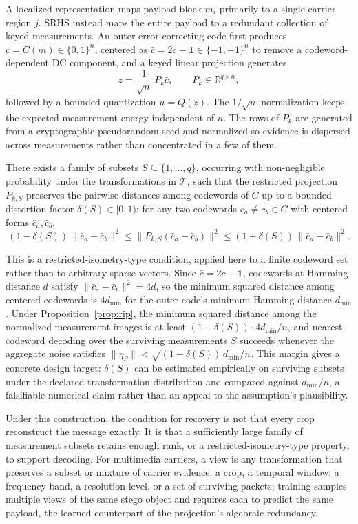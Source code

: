 A localized representation maps payload block $m_i$ primarily to a single carrier region $j$. SRHS instead maps the entire payload to a redundant collection of keyed measurements. An outer error-correcting code first produces $c = C(m) \in \{0,1\}^n$, centered as $\bar c = 2c - \mathbf{1} \in \{-1,+1\}^n$ to remove a codeword-dependent DC component, and a keyed linear projection generates
\[
z = \frac{1}{\sqrt n}\, P_k \bar c, \qquad P_k \in \mathbb{R}^{q \times n},
\]
followed by a bounded quantization $u = Q(z)$. The $1/\sqrt n$ normalization keeps the expected measurement energy independent of $n$. The rows of $P_k$ are generated from a cryptographic pseudorandom seed and normalized so evidence is dispersed across measurements rather than concentrated in a few of them.

\begin{proposition}
\label{prop:rip}
There exists a family of subsets $S \subseteq \{1,\ldots,q\}$, occurring with non-negligible probability under the transformations in $\mathcal{T}$, such that the restricted projection $P_{k,S}$ preserves the pairwise distances among codewords of $C$ up to a bounded distortion factor $\delta(S) \in [0,1)$: for any two codewords $c_a \neq c_b \in C$ with centered forms $\bar c_a, \bar c_b$,
\[
(1-\delta(S))\,\|\bar c_a - \bar c_b\|^2 \leq \|P_{k,S}(\bar c_a - \bar c_b)\|^2 \leq (1+\delta(S))\,\|\bar c_a - \bar c_b\|^2.
\]
\end{proposition}

This is a restricted-isometry-type condition, applied here to a finite codeword set rather than to arbitrary sparse vectors. Since $\bar c = 2c - \mathbf{1}$, codewords at Hamming distance $d$ satisfy $\|\bar c_a - \bar c_b\|^2 = 4d$, so the minimum squared distance among centered codewords is $4d_{\min}$ for the outer code's minimum Hamming distance $d_{\min}$. Under Proposition~\ref{prop:rip}, the minimum squared distance among the normalized measurement images is at least $(1-\delta(S)) \cdot 4d_{\min}/n$, and nearest-codeword decoding over the surviving measurements $S$ succeeds whenever the aggregate noise satisfies $\|\eta_S\| < \sqrt{(1-\delta(S))\, d_{\min}/n}$. This margin gives a concrete design target: $\delta(S)$ can be estimated empirically on surviving subsets under the declared transformation distribution and compared against $d_{\min}/n$, a falsifiable numerical claim rather than an appeal to the assumption's plausibility.

Under this construction, the condition for recovery is not that every crop reconstruct the message exactly. It is that a sufficiently large family of measurement subsets retains enough rank, or a restricted-isometry-type property, to support decoding. For multimedia carriers, a view is any transformation that preserves a subset or mixture of carrier evidence: a crop, a temporal window, a frequency band, a resolution level, or a set of surviving packets; training samples multiple views of the same stego object and requires each to predict the same payload, the learned counterpart of the projection's algebraic redundancy.

